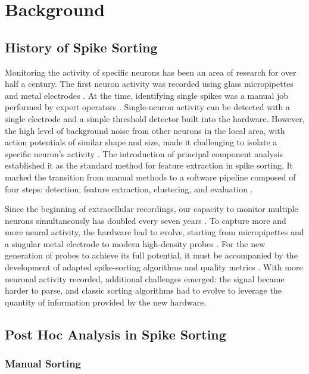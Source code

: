 \section{Background}
\label{sec:background}

\subsection{History of Spike Sorting}

Monitoring the activity of specific neurons has been an area of research for over half a century. The first neuron activity was recorded using glass micropipettes and metal electrodes \parencite{Hubel1962}. At the time, identifying single spikes was a manual job performed by expert operators \parencite{Hubel1962}. Single-neuron activity can be detected with a single electrode and a simple threshold detector built into the hardware. However, the high level of background noise from other neurons in the local area, with action potentials of similar shape and size, made it challenging to isolate a specific neuron's activity \parencite{Lewicki1998}. The introduction of principal component analysis established it as the standard method for feature extraction in spike sorting. It marked the transition from manual methods to a software pipeline composed of four steps: detection, feature extraction, clustering, and evaluation \parencite{Lewicki1998}.

Since the beginning of extracellular recordings, our capacity to monitor multiple neurons simultaneously has doubled every seven years \parencite{Stevenson2011}. To capture more and more neural activity, the hardware had to evolve, starting from micropipettes and a singular metal electrode \parencite{Hubel1962} to modern high-density probes \parencite{Jun2017}. For the new generation of probes to achieve its full potential, it must be accompanied by the development of adapted spike-sorting algorithms and quality metrics \parencite{EINEVOLL201211}. With more neuronal activity recorded, additional challenges emerged: the signal became harder to parse, and classic sorting algorithms had to evolve to leverage the quantity of information provided by the new hardware.

\subsection{Post Hoc Analysis in Spike Sorting}

\subsubsection{Manual Sorting}

